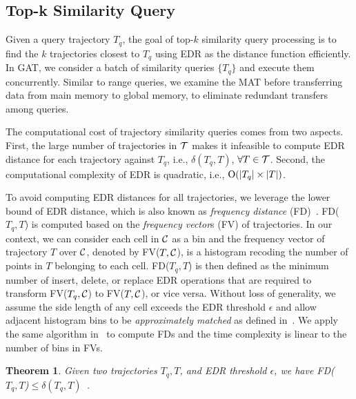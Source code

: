 \documentclass[10pt,conference,letterpaper]{IEEEtran}
\newcommand{\frname}{GAT\xspace }
\newcommand{\alltraj}{{{\cal T}}\xspace}
\newcommand{\edr}{{\delta}\xspace}
\newcommand{\allcell}{{\cal C}\xspace}
\newcommand{\bigoh}{{\rm O}\xspace}
\newtheorem{theorem}{Theorem}
\begin{document}


\subsection{Top-k Similarity Query}


Given a query trajectory $T_q$, the goal of top-$k$ similarity query processing is to find the $k$ trajectories closest to $T_q$ using EDR as the distance function efficiently.
In \frname, we consider a batch of similarity queries $\{T_q\}$ and execute them concurrently.
Similar to range queries, we examine the MAT before transferring data from main memory to global memory, to eliminate redundant transfers among queries.


The computational cost of trajectory similarity queries comes from two aspects. First, the large number of trajectories in $\alltraj$ makes it infeasible to compute EDR distance for each trajectory against $T_q$, i.e., $\edr(T_q, T)$, $\forall T\in\alltraj$. Second, the computational complexity of EDR is quadratic, i.e., $\bigoh(|T_q|\times|T|)$.

To avoid computing EDR distances for all trajectories, we leverage the lower bound of EDR distance, which is also known as \emph{frequency distance} (FD)~\cite{DBLP:conf/sigmod/ChenOO05}.
FD($T_q, T$) is computed based on the \emph{frequency vector}s (FV) of trajectories. In our context, we can consider each cell in $\allcell$ as a bin and the frequency vector of trajectory $T$ over $\allcell$, denoted by FV($T, \allcell$), is a histogram recoding the number of points in $T$ belonging to each cell.
FD($T_q, T$) is then defined as the minimum number of insert, delete, or replace EDR operations that are required to transform FV($T_q, \allcell$) to FV($T,\allcell$), or vice versa. Without loss of generality, we assume the side length of any cell exceeds the EDR threshold $\epsilon$ and allow adjacent histogram bins to be \emph{approximately matched} as defined in~\cite{DBLP:conf/sigmod/ChenOO05}.
We apply the same algorithm in~\cite{DBLP:conf/sigmod/ChenOO05} to compute FDs and the time complexity is linear to the number of bins in FVs.

\begin{theorem}\label{the:lb}
	Given two trajectories $T_q, T$, and EDR threshold $\epsilon$, we have FD($T_q, T$)$\leq \edr(T_q, T)$~\cite{DBLP:conf/sigmod/ChenOO05}.
\end{theorem}
\end{document}
